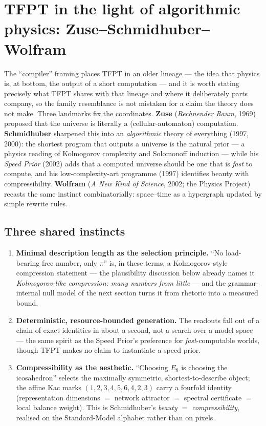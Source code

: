 \section{TFPT in the light of algorithmic physics: Zuse--Schmidhuber--Wolfram}
\noindent The ``compiler'' framing places TFPT in an older lineage --- the idea that
physics is, at bottom, the output of a short computation --- and it is worth stating
precisely what TFPT shares with that lineage and where it deliberately parts company, so
the family resemblance is not mistaken for a claim the theory does not make. Three
landmarks fix the coordinates. \textbf{Zuse} (\emph{Rechnender Raum}, 1969) proposed that
the universe is literally a (cellular-automaton) computation. \textbf{Schmidhuber}
sharpened this into an \emph{algorithmic} theory of everything (1997, 2000): the shortest
program that outputs a universe is the natural prior --- a physics reading of Kolmogorov
complexity and Solomonoff induction --- while his \emph{Speed Prior} (2002) adds that a
computed universe should be one that is \emph{fast} to compute, and his
low-complexity-art programme (1997) identifies beauty with compressibility.
\textbf{Wolfram} (\emph{A New Kind of Science}, 2002; the Physics Project) recasts the
same instinct combinatorially: space--time as a hypergraph updated by simple rewrite
rules.

\subsection*{Three shared instincts}
\begin{enumerate}[leftmargin=1.6em,itemsep=2pt,topsep=2pt]
\item \textbf{Minimal description length as the selection principle.} ``No load-bearing
      free number, only $\pi$'' is, in these terms, a Kolmogorov-style compression
      statement --- the plausibility discussion below already names it
      \emph{Kolmogorov-like compression: many numbers from little} --- and the
      grammar-internal null model of the next section turns it from rhetoric into a
      measured bound.
\item \textbf{Deterministic, resource-bounded generation.} The readouts fall out of a
      chain of exact identities in about a second, not a search over a model space ---
      the same spirit as the Speed Prior's preference for \emph{fast}-computable worlds,
      though TFPT makes no claim to instantiate a speed prior.
\item \textbf{Compressibility as the aesthetic.} ``Choosing $E_8$ is choosing the
      icosahedron'' selects the maximally symmetric, shortest-to-describe object; the
      affine Kac marks $(1,2,3,4,5,6,4,2,3)$ carry a fourfold identity (representation
      dimensions $=$ network attractor $=$ spectral certificate $=$ local balance
      weight). This is Schmidhuber's \emph{beauty $=$ compressibility}, realised on the
      Standard-Model alphabet rather than on pixels.
\end{enumerate}


